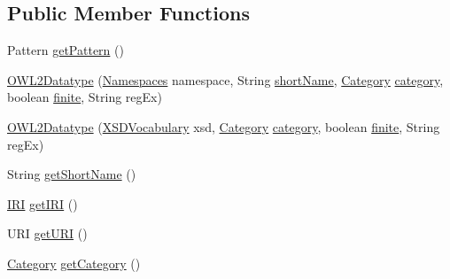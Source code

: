 \subsection*{Public Member Functions}
\begin{DoxyCompactItemize}
\item 
Pattern \hyperlink{enumorg_1_1semanticweb_1_1owlapi_1_1vocab_1_1_o_w_l2_datatype_a912f9ddd1e5cfeddf98c6b0a34d260af}{get\-Pattern} ()
\item 
\hyperlink{enumorg_1_1semanticweb_1_1owlapi_1_1vocab_1_1_o_w_l2_datatype_a252e861c7619d89cce7a4d36fdbca976}{O\-W\-L2\-Datatype} (\hyperlink{enumorg_1_1semanticweb_1_1owlapi_1_1vocab_1_1_namespaces}{Namespaces} namespace, String \hyperlink{enumorg_1_1semanticweb_1_1owlapi_1_1vocab_1_1_o_w_l2_datatype_a71c126238b4d6eeb14f8ecf1ebd81d5c}{short\-Name}, \hyperlink{enumorg_1_1semanticweb_1_1owlapi_1_1vocab_1_1_o_w_l2_datatype_1_1_category}{Category} \hyperlink{enumorg_1_1semanticweb_1_1owlapi_1_1vocab_1_1_o_w_l2_datatype_a45d3db6d61e64de97c6e2b4bd1793f03}{category}, boolean \hyperlink{enumorg_1_1semanticweb_1_1owlapi_1_1vocab_1_1_o_w_l2_datatype_a8a9285b973af285aabba8a1dc92b26ff}{finite}, String reg\-Ex)
\item 
\hyperlink{enumorg_1_1semanticweb_1_1owlapi_1_1vocab_1_1_o_w_l2_datatype_a7b79266b349f67387db6165b592b9ab1}{O\-W\-L2\-Datatype} (\hyperlink{enumorg_1_1semanticweb_1_1owlapi_1_1vocab_1_1_x_s_d_vocabulary}{X\-S\-D\-Vocabulary} xsd, \hyperlink{enumorg_1_1semanticweb_1_1owlapi_1_1vocab_1_1_o_w_l2_datatype_1_1_category}{Category} \hyperlink{enumorg_1_1semanticweb_1_1owlapi_1_1vocab_1_1_o_w_l2_datatype_a45d3db6d61e64de97c6e2b4bd1793f03}{category}, boolean \hyperlink{enumorg_1_1semanticweb_1_1owlapi_1_1vocab_1_1_o_w_l2_datatype_a8a9285b973af285aabba8a1dc92b26ff}{finite}, String reg\-Ex)
\item 
String \hyperlink{enumorg_1_1semanticweb_1_1owlapi_1_1vocab_1_1_o_w_l2_datatype_a49cd8cec9d321262cdcaa460f5d48142}{get\-Short\-Name} ()
\item 
\hyperlink{classorg_1_1semanticweb_1_1owlapi_1_1model_1_1_i_r_i}{I\-R\-I} \hyperlink{enumorg_1_1semanticweb_1_1owlapi_1_1vocab_1_1_o_w_l2_datatype_a2e049b76f643281e369590abf8be04af}{get\-I\-R\-I} ()
\item 
U\-R\-I \hyperlink{enumorg_1_1semanticweb_1_1owlapi_1_1vocab_1_1_o_w_l2_datatype_a06659a58fd5fd7f53c1779d2e0298d36}{get\-U\-R\-I} ()
\item 
\hyperlink{enumorg_1_1semanticweb_1_1owlapi_1_1vocab_1_1_o_w_l2_datatype_1_1_category}{Category} \hyperlink{enumorg_1_1semanticweb_1_1owlapi_1_1vocab_1_1_o_w_l2_datatype_a87c573db2917f8fa8ae27aed1dcdf5b2}{get\-Category} ()

\end{DoxyCompactItemize}
